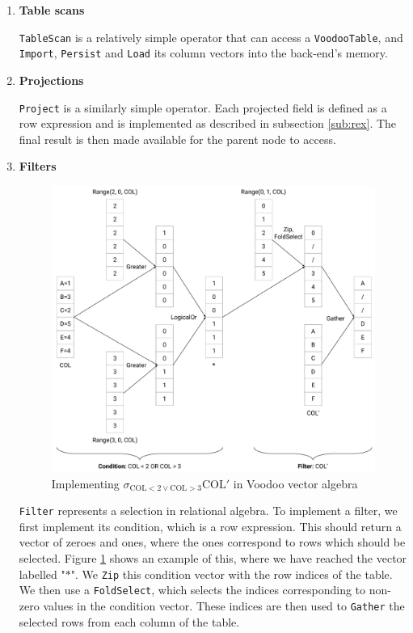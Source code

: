 \begin{enumerate}
    \item \textbf{Table scans}
    
    \texttt{TableScan} is a relatively simple operator that can access a \texttt{VoodooTable}, and \texttt{Import}, \texttt{Persist} and \texttt{Load} its column vectors into the back-end's memory.

    \item \textbf{Projections}
    
    \texttt{Project} is a similarly simple operator. Each projected field is defined as a row expression and is implemented as described in subsection \ref{sub:rex}. The final result is then made available for the parent node to access.

    \item \textbf{Filters}

    \begin{figure}[H]
        \centering
        \includegraphics[width=0.75\linewidth]{appendix/filter.pdf}
        \caption{Implementing $\sigma_{\text{COL} < 2 \lor \text{COL} > 3}\text{COL}'$ in Voodoo vector algebra}
        \label{fig:filter}
    \end{figure}
    
    \texttt{Filter} represents a selection in relational algebra. To implement a filter, we first implement its condition, which is a row expression. This should return a vector of zeroes and ones, where the ones correspond to rows which should be selected. Figure \ref{fig:filter} shows an example of this, where we have reached the vector labelled "$*$". We \texttt{Zip} this condition vector with the row indices of the table. We then use a \texttt{FoldSelect}, which selects the indices corresponding to non-zero values in the condition vector. These indices are then used to \texttt{Gather} the selected rows from each column of the table.
    

\end{enumerate}
